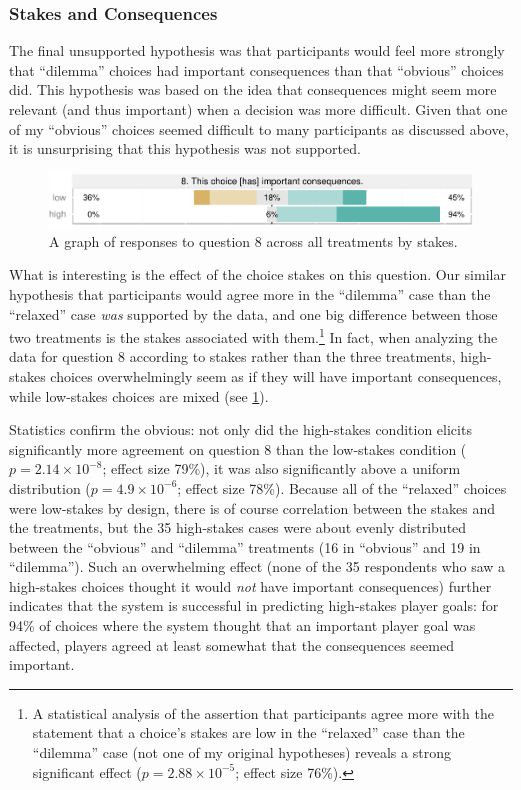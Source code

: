 \subsubsection{Stakes and Consequences}

The final unsupported hypothesis was that participants would feel more strongly that ``dilemma'' choices had important consequences than that ``obvious'' choices did.
%
This hypothesis was based on the idea that consequences might seem more relevant (and thus important) when a decision was more difficult.
%
Given that one of my ``obvious'' choices seemed difficult to many participants as discussed above, it is unsurprising that this hypothesis was not supported.


\begin{figure}[!h]
  \includegraphics[width=\textwidth]{fig/stakes-q8.pdf}
  \caption[Prospective consequences results by stakes]{A graph of responses to question 8 across all treatments by stakes.}
  \label{fig:s1-stakesq8}
\end{figure}


What is interesting is the effect of the choice stakes on this question.
%
Our similar hypothesis that participants would agree more in the ``dilemma'' case than the ``relaxed'' case \emph{was} supported by the data, and one big difference between those two treatments is the stakes associated with them.\footnote{A statistical analysis of the assertion that participants agree more with the statement that a choice's stakes are low in the ``relaxed'' case than the ``dilemma'' case (not one of my original hypotheses) reveals a strong significant effect ($p = 2.88\times10^{-5}$; effect size 76\%).}
%
In fact, when analyzing the data for question 8 according to stakes rather than the three treatments, high-stakes choices overwhelmingly seem as if they will have important consequences, while low-stakes choices are mixed (see \cref{fig:s1-stakesq8}).


Statistics confirm the obvious: not only did the high-stakes condition elicits significantly more agreement on question 8 than the low-stakes condition ($p = 2.14\times10^{-8}$; effect size 79\%), it was also significantly above a uniform distribution ($p = 4.9\times10^{-6}$; effect size 78\%).
%
Because all of the ``relaxed'' choices were low-stakes by design, there is of course correlation between the stakes and the treatments, but the 35 high-stakes cases were about evenly distributed between the ``obvious'' and ``dilemma'' treatments (16 in ``obvious'' and 19 in ``dilemma'').
%
Such an overwhelming effect (none of the 35 respondents who saw a high-stakes choices thought it would \emph{not} have important consequences) further indicates that the system is successful in predicting high-stakes player goals: for 94\% of choices where the system thought that an important player goal was affected, players agreed at least somewhat that the consequences seemed important.


